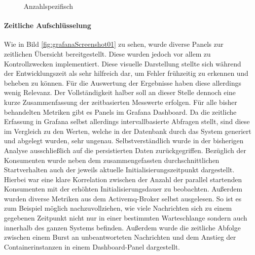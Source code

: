 \begin{figure}
  \vspace{-12mm}
  \centering
  \caption[Startzeit Container - Anzahl spezifisch]{Anzahlspezifisch}
  \label{fig:specContainers}
\end{figure}


\paragraph{Zeitliche Aufschlüsselung \checkmark}
Wie in Bild \ref{fig:grafanaScreenshot01} zu sehen, wurde diverse Panels zur zeitlichen Übersicht bereitgestellt. Diese wurden jedoch vor allem zu Kontrollzwecken implementiert. Diese visuelle Darstellung stellte sich während der Entwicklungszeit als sehr hilfreich dar, um Fehler frühzeitig zu erkennen und beheben zu können. Für die Auswertung der Ergebnisse haben diese allerdings wenig Relevanz. Der Vollständigkeit halber soll an dieser Stelle dennoch eine kurze Zusammenfassung der zeitbasierten Messwerte erfolgen. Für alle bisher behandelten Metriken gibt es Panels im Grafana Dashboard. Da die zeitliche Erfassung in Grafana selbst allerdings intervallbasierte Abfragen stellt, sind diese im Vergleich zu den Werten, welche in der Datenbank durch das System generiert und abgelegt wurden, sehr ungenau. Selbstverständlich wurde in der bisherigen Analyse ausschließlich auf die persistierten Daten zurückgegriffen. Bezüglich der Konsumenten wurde neben dem zusammengefassten durchschnittlichen Startverhalten auch der jeweils aktuelle Initialisierungszeitpunkt dargestellt. Hierbei war eine klare Korrelation zwischen der Anzahl der parallel startenden Konsumenten mit der erhöhten Initialisierungsdauer zu beobachten. Außerdem wurden diverse Metriken aus dem Activemq-Broker selbst ausgelesen. So ist es zum Beispiel möglich nachzuvollziehen, wie viele Nachrichten sich zu einem gegebenen Zeitpunkt nicht nur in einer bestimmten Warteschlange sondern auch innerhalb des ganzen Systems befinden. Außerdem wurde die zeitliche Abfolge zwischen einem Burst an unbeantworteten Nachrichten und dem Anstieg der Containerinstanzen in einem Dashboard-Panel dargestellt.

